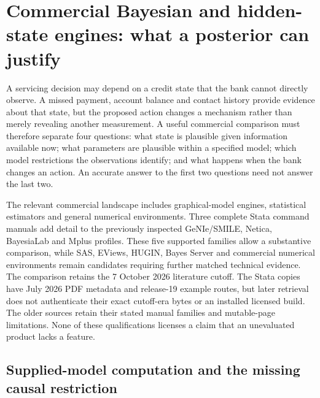 \section{Commercial Bayesian and hidden-state engines: what a posterior can justify}
\label{exec22:state-scope}

A servicing decision may depend on a credit state that the bank cannot directly
observe. A missed payment, account balance and contact history provide evidence
about that state, but the proposed action changes a mechanism rather than merely
revealing another measurement. A useful commercial comparison must therefore
separate four questions: what state is plausible given information available now;
what parameters are plausible within a specified model; which model restrictions
the observations identify; and what happens when the bank changes an action.
An accurate answer to the first two questions need not answer the last two.

The relevant commercial landscape includes graphical-model engines, statistical
estimators and general numerical environments. Three complete Stata command
manuals add detail to the previously inspected GeNIe/SMILE, Netica, BayesiaLab and
Mplus profiles. These five supported families allow a substantive comparison,
while SAS, EViews, HUGIN, Bayes Server and commercial numerical environments
remain candidates requiring further matched technical evidence. The comparison
retains the 7 October 2026 literature cutoff. The Stata copies have July 2026 PDF
metadata and release-19 example routes, but later retrieval does not authenticate
their exact cutoff-era bytes or an installed licensed build. The older sources
retain their stated manual families and mutable-page limitations. None of these
qualifications licenses a claim that an unevaluated product lacks a feature.

\subsection{Supplied-model computation and the missing causal restriction}
\label{exec22:state-identification}

